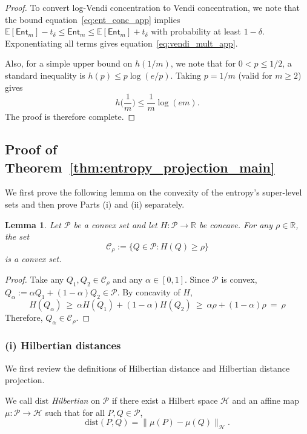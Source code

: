 \documentclass{article}
\newtheorem{lemma}{Lemma}
\theoremstyle{plain}
\theoremstyle{definition}
\def\eqref#1{equation~\ref{#1}}
\begin{document}
\begin{appendices}
\begin{proof}
To convert log-Vendi concentration to Vendi concentration, we note that
the bound \eqref{eq:ent_conc_app} implies
$\mathbb{E}[\mathsf{Ent}_m]-t_\delta \le \mathsf{Ent}_m \le \mathbb{E}[\mathsf{Ent}_m]+t_\delta$
with probability at least $1-\delta$.
Exponentiating all terms gives \eqref{eq:vendi_mult_app}.

Also, for a simple upper bound on $h(1/m)$, we note that for $0<p\le 1/2$, a standard inequality is $h(p)\le p\log(e/p)$.
Taking $p=1/m$ (valid for $m\ge 2$) gives
\[
h\bigl(\frac{1}{m}\bigr) \le \frac{1}{m}\log(em).
\]
The proof is therefore complete.
\end{proof}








\subsection{Proof of Theorem~\ref{thm:entropy_projection_main}}
\label{app:entropy_projection_proofs}
We first prove the following lemma on the convexity of the entropy's super-level sets and then prove Parts (i) and (ii) separately. 

\begin{lemma}\label{lem:superlevel_convex}
Let $\mathcal{P}$ be a convex set and let $H:\mathcal{P}\to\mathbb{R}$ be concave.
For any $\rho\in\mathbb{R}$, the set
\[
\mathcal{C}_\rho := \{Q\in\mathcal{P}: H(Q)\ge \rho\}
\]
is  a convex set.
\end{lemma}

\begin{proof}
Take any $Q_1,Q_2\in\mathcal{C}_\rho$ and any $\alpha\in[0,1]$.
Since $\mathcal{P}$ is convex, $Q_\alpha:=\alpha Q_1+(1-\alpha)Q_2\in\mathcal{P}$.
By concavity of $H$,
\[
H(Q_\alpha)\ \ge\ \alpha H(Q_1)+(1-\alpha)H(Q_2)\ \ge\ \alpha\rho+(1-\alpha)\rho\ =\ \rho
\]
Therefore, $Q_\alpha\in\mathcal{C}_\rho$.
\end{proof}




\subsubsection*{(i) Hilbertian distances}
We first review the definitions of Hilbertian distance and Hilbertian distance projection. 

We call $\mathrm{dist}$  \emph{Hilbertian} on $\mathcal{P}$ if there exist a Hilbert space
$\mathcal{H}$ and an affine map $\mu:\mathcal{P}\to\mathcal{H}$ such that for all $P,Q\in\mathcal{P}$,
\[
\mathrm{dist}(P,Q)=\|\mu(P)-\mu(Q)\|_{\mathcal{H}}.
\]


\end{appendices}
\end{document}
